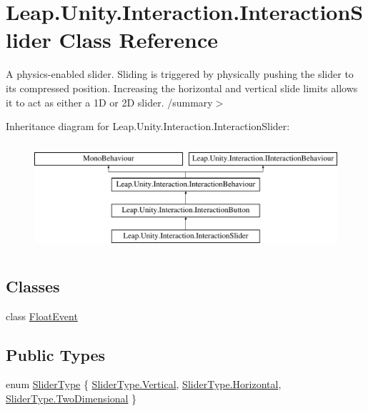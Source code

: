 \hypertarget{class_leap_1_1_unity_1_1_interaction_1_1_interaction_slider}{}\section{Leap.\+Unity.\+Interaction.\+Interaction\+Slider Class Reference}
\label{class_leap_1_1_unity_1_1_interaction_1_1_interaction_slider}


A physics-\/enabled slider. Sliding is triggered by physically pushing the slider to its compressed position. Increasing the horizontal and vertical slide limits allows it to act as either a 1D or 2D slider. /summary$>$  


Inheritance diagram for Leap.\+Unity.\+Interaction.\+Interaction\+Slider\+:\begin{figure}[H]
\begin{center}
\leavevmode
\includegraphics[height=4.000000cm]{class_leap_1_1_unity_1_1_interaction_1_1_interaction_slider}
\end{center}
\end{figure}
\subsection*{Classes}
\begin{DoxyCompactItemize}
\item 
class \mbox{\hyperlink{class_leap_1_1_unity_1_1_interaction_1_1_interaction_slider_1_1_float_event}{Float\+Event}}
\end{DoxyCompactItemize}
\subsection*{Public Types}
\begin{DoxyCompactItemize}
\item 
enum \mbox{\hyperlink{class_leap_1_1_unity_1_1_interaction_1_1_interaction_slider_ae3fefc578d521cc71c2ea5d222e01748}{Slider\+Type}} \{ \mbox{\hyperlink{class_leap_1_1_unity_1_1_interaction_1_1_interaction_slider_ae3fefc578d521cc71c2ea5d222e01748a06ce2a25e5d12c166a36f654dbea6012}{Slider\+Type.\+Vertical}}, 
\mbox{\hyperlink{class_leap_1_1_unity_1_1_interaction_1_1_interaction_slider_ae3fefc578d521cc71c2ea5d222e01748ac1b5fa03ecdb95d4a45dd1c40b02527f}{Slider\+Type.\+Horizontal}}, 
\mbox{\hyperlink{class_leap_1_1_unity_1_1_interaction_1_1_interaction_slider_ae3fefc578d521cc71c2ea5d222e01748a5c439358dbee64daba17b27a722983ff}{Slider\+Type.\+Two\+Dimensional}}
 \}
\end{DoxyCompactItemize}
